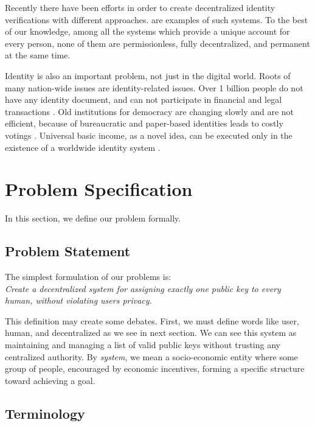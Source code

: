 \documentclass[conference]{IEEEtran}
\begin{document}
Recently there have been efforts in order to create decentralized identity verifications with different approaches. \cite{proofofpersonhood, uport, sovrin} are examples of such systems. To the best of our knowledge, among all the systems which provide a unique account for every person, none of them are permissionless, fully decentralized, and permanent at the same time.


Identity is also an important problem, not just in the digital world. Roots of many nation-wide issues are identity-related issues. Over 1 billion people do not have any identity document, and can not participate in financial and legal transactions \cite{worldbankid}. Old institutions for democracy are changing slowly and are not efficient, because of bureaucratic and paper-based identities leads to costly votings \cite{democracyearth}. Universal basic income, as a novel idea, can be executed only in the existence of a worldwide identity system \cite{basicincome}.




\section{ Problem Specification}
In this section, we define our problem formally.

\subsection{Problem Statement}
The simplest formulation of our problems is: \\
\textit{Create a decentralized system for assigning exactly one public key to every human, without violating users privacy. }


This definition may create some debates. First, we must define words like user, human, and decentralized as we see in next section. We can see this system as maintaining and managing a list of valid public keys without trusting any centralized authority. By \textit{system}, we mean a socio-economic entity where some group of people, encouraged by economic incentives, forming a specific structure toward achieving a goal. 

\subsection{Terminology}
\end{document}

